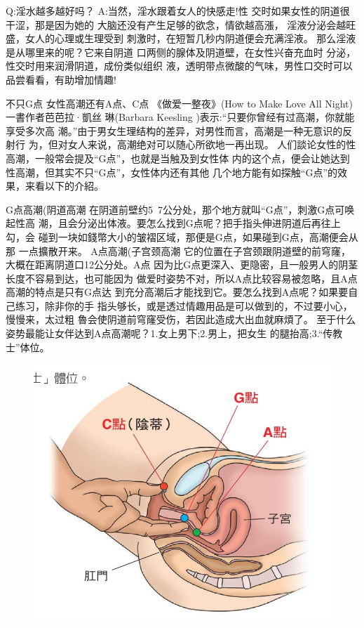 \documentclass[12pt,UTF8]{ctexbook}
\begin{document}
Q:淫水越多越好吗？
A:当然，淫水跟着女人的快感走!性
交时如果女性的阴道很干涩，那是因为她的
大脑还没有产生足够的欲念，情欲越高漲，
淫液分泌会越旺盛，女人的心理或生理受到
刺激时，在短暂几秒内阴道便会充满淫液。
那么淫液是从哪里来的呢？它来自阴道
口两侧的腺体及阴道壁，在女性兴奋充血时
分泌，性交时用来润滑阴道，成份类似组织
液，透明带点微酸的气味，男性口交时可以
品尝看看，有助增加情趣!

不只G点
女性高潮还有A点、C点
《做爱一整夜》(How to Make Love All Night)一書作者芭芭拉·凱丝
琳(Barbara Keesling )表示:“只要你曾经有过高潮，你就能享受多次高
潮。”由于男女生理结构的差异，对男性而言，高潮是一种无意识的反射行
为，但对女人来说，高潮绝对可以随心所欲地一再出现。
人们談论女性的性高潮，一般常会提及“G点”，也就是当触及到女性体
内的这个点，便会让她达到性高潮，但其实不只“G点”，女性体内还有其他
几个地方能有如探触“G点”的效果，来看以下的介紹。

G点高潮(阴道高潮
在阴道前壁约5~7公分处，那个地方就叫“G点”，刺激G点可唤起性高
潮，且会分泌出体液。要怎么找到G点呢？把手指头伸进阴道后再往上勾，会
碰到一块如錢幣大小的皱褶区域，那便是G点，如果碰到G点，高潮便会从那
一点擴散开来。
A点高潮(子宫颈高潮
它的位置在子宫颈跟阴道壁的前穹窿，大概在距离阴道口12公分处。A点
因为比G点更深入、更隐密，且一般男人的阴茎长度不容易到达，也可能因为
做爱时姿势不对，所以A点比较容易被忽略，且A点高潮的特点是只有G点达
到充分高潮后才能找到它。要怎么找到A点呢？如果要自己练习，除非你的手
指头够长，或是透过情趣用品是可以做到的，不过要小心，慢慢来，太过粗
魯会使阴道前穹窿受伤，若因此造成大出血就麻煩了。
至于什么姿势最能让女伴达到A点高潮呢？1.女上男下;2.男上，把女生
的腿抬高;3.“传教士”体位。

\begin{figure}[htbp]
	\centering
	\includegraphics[width=0.7\linewidth]{16}
	\caption{}
	\label{fig:1}
\end{figure}
\end{document}
